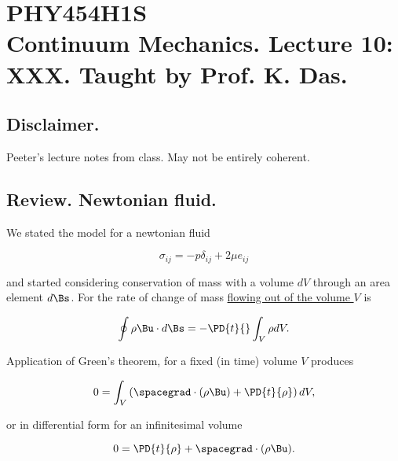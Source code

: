 
%

\chapter{PHY454H1S\\Continuum Mechanics.  Lecture 10: XXX.  Taught by Prof. K. Das.}
\label{chap:continuumL10}
{}
\date{Feb 10, 2012}

\beginArtWithToc

\section{Disclaimer.}

Peeter's lecture notes from class.  May not be entirely coherent.

\section{Review.  Newtonian fluid.}

We stated the model for a newtonian fluid

\begin{equation}\label{eqn:continuumL10:10}
\sigma_{ij} = -p \delta_{ij} + 2 \mu e_{ij}
\end{equation}

and started considering conservation of mass with a volume $dV$ through an area element $d\Bs$.  For the rate of change of mass \underline{flowing out of the volume $V$} is 

\begin{equation}\label{eqn:continuumL10:30}
\oint \rho \Bu \cdot d\Bs = - \PD{t}{} \int_V \rho dV.
\end{equation}

Application of Green's theorem, for a fixed (in time) volume $V$ produces

\begin{equation}\label{eqn:continuumL10:50}
0 = \int_V \left( \spacegrad \cdot (\rho \Bu) + \PD{t}{\rho} \right) dV,
\end{equation}

or in differential form for an infinitesimal volume

\begin{equation}\label{eqn:continuumL10:70}
0 = \PD{t}{\rho} + \spacegrad \cdot (\rho \Bu).
\end{equation}

